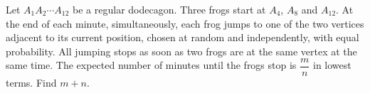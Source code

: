 Let $A_1A_2\cdots A_{12}$ be a regular dodecagon. Three frogs start at $A_4$, $A_8$ and $A_{12}$. At the end of each minute, simultaneously, each frog jumps to one of the two vertices adjacent to its current position, chosen at random and independently, with equal probability. All jumping stops as soon as two frogs are at the same vertex at the same time. The expected number of minutes until the frogs stop is $\dfrac mn$ in lowest terms. Find $m+n$.
